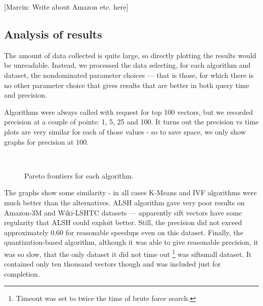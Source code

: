 [Marcin: Write about Amazon etc. here]



\subsection{Analysis of results}

The amount of data collected is quite large, so directly plotting the results would be
unreadable. Instead, we processed the data selecting, for each algorithm and dataset,
the nondominated parameter choices --- that is those, for which there is no other
parameter choice that gives results that are better in both query time and precision.

Algorithms were always called with request for top 100 vectors, but we recorded
precision at a couple of points: 1, 5, 25 and 100. It turns out the precision vs time
plots are very similar for each of those values - so to save space, we only show
graphs for precision at 100.

\begin{figure}[H]
	\centering
	\\
\caption{Pareto frontiers for each algorithm.}
\end{figure}

The graphs show some similarity - in all cases K-Means and IVF algorithms were much better
than the alternatives. ALSH algorithm gave very poor results on Amazon-3M and Wiki-LSHTC
datasets --- apparently sift vectors have some regularity that ALSH could exploit better.
Still, the precision did not exceed approximately $0.60$ for reasonable speedups even on
this dataset. Finally, the quantization-based algorithm, although it was able to give
reasonable precision, it was so slow, that the only dataset it did not time out
\footnote{Timeout was set to twice the time of brute force search.}
was siftsmall dataset. It contained only ten thousand vectors though and was included
just for completion.

